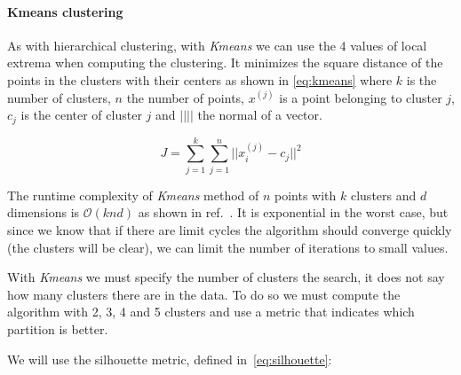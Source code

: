 \paragraph{Kmeans clustering}

As with hierarchical clustering, with \emph{Kmeans} we can use the 4 values of
local extrema when computing the clustering. It minimizes the square distance of
the points in the clusters with their centers as shown in \cref{eq:kmeans}
where $k$ is the number of clusters, $n$ the number of points,
$x^{(j)}$ is a point belonging to cluster $j$, $c_j$ is the center of
cluster $j$ and $|| ||$ the normal of a vector.

\begin{equation}\label{eq:kmeans}
    J = \sum_{j=1}^k \sum_{j=1}^n || x_i^{(j)} - c_j ||^2
\end{equation}


The
runtime complexity of \emph{Kmeans} method of $n$ points with $k$ clusters and
$d$ dimensions is $\mathcal{O}(knd)$ as shown in
ref.~\cite{arthur_k-means_2009}.  It is exponential in the worst case, but since
we know that if there are limit cycles the algorithm should converge quickly
(the clusters will be clear), we can limit the number of iterations to small
values.

With \emph{Kmeans} we must specify the number of clusters the search, it does not
say how many clusters there are in the data. To do so we must compute the algorithm
with 2, 3, 4 and 5 clusters and use a metric that indicates which partition is better.

We will use the silhouette metric, defined in~\cref{eq:silhouette}:

\begin{equation}\label{eq:silhouette}
\end{equation}
